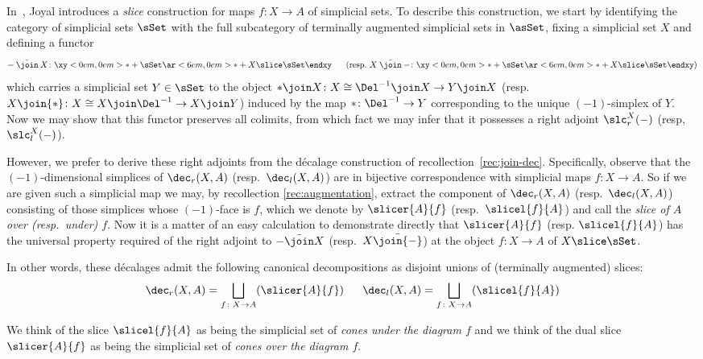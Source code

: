   \begin{defn}\label{defn:slices}
    In~\cite{Joyal:2002:QuasiCategories}, Joyal introduces a {\em slice\/} construction for maps $f\colon X\to A$ of simplicial sets. To describe this construction, we start by identifying the category of simplicial sets $\sSet$ with the full subcategory of terminally augmented simplicial sets in $\asSet$, fixing a simplicial set $X$ and defining a functor 
    \begin{equation*}
      {-}\mathbin{\bar\join} X\colon \xy<0em,0em>*+{\sSet}\ar <6em,0em>*+{X\slice\sSet}\endxy\mkern30mu
      (\text{resp.\ } 
      X\mathbin{\bar\join}{-}\colon \xy<0em,0em>*+{\sSet}\ar <6em,0em>*+{X\slice\sSet}\endxy)
    \end{equation*}
    which carries a simplicial set $Y\in\sSet$ to the object ${*}\join X\colon X\cong\Del^{-1}\join X\to Y\join X$ (resp.\ $X\join{*}\colon X\cong X\join\Del^{-1} \to X\join Y$) induced by the map ${*}\colon\Del^{-1}\to Y$ corresponding to the unique $(-1)$-simplex of $Y$. Now we may show that this functor preserves all colimits, from which fact we may infer that it possesses a right adjoint $\slc^X_r({-})$ (resp,\ $\slc^X_l({-})$). 
    
    However, we prefer to derive these right adjoints from the d{\'e}calage construction of recollection~\ref{rec:join-dec}. Specifically, observe that the $(-1)$-dimensional simplices of $\dec_r(X, A)$ (resp.\ $\dec_l(X,A)$) are in bijective correspondence with simplicial maps $f\colon X\to A$. So if we are given such a simplicial map we may, by recollection \ref{rec:augmentation}, extract the component of $\dec_r(X,A)$ (resp.\ $\dec_l(X,A)$) consisting of those simplices whose $(-1)$-face is $f$, which we denote by $\slicer{A}{f}$ (resp.\ $\slicel{f}{A}$) and call the {\em slice of $A$ over (resp.\ under) $f$}. Now it is a matter of an easy calculation to demonstrate directly that $\slicer{A}{f}$ (resp. $\slicel{f}{A}$) has the universal property required of the right adjoint to ${-}\bar\join X$ (resp.\ $X\bar\join {-}$) at the object $f\colon X\to A$ of $X\slice\sSet$.

    In other words, these d{\'e}calages admit the following canonical decompositions as disjoint unions of (terminally augmented) slices: 
    \begin{equation*}
      \dec_r(X,A)=\bigsqcup_{f\colon X\to A} (\slicer{A}{f})\mkern30mu
      \dec_l(X,A)=\bigsqcup_{f\colon X\to A} (\slicel{f}{A})
    \end{equation*}

    We think of the slice $\slicel{f}{A}$ as being the simplicial set of {\em cones under the diagram $f$\/} and we think of the dual slice $\slicer{A}{f}$ as being the simplicial set of {\em cones over the diagram $f$}.
  \end{defn}
  
